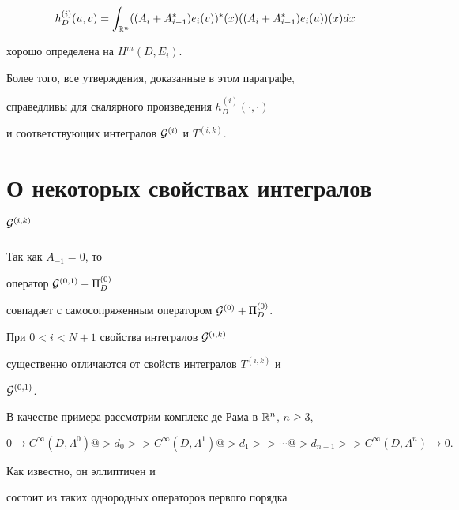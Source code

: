 \begin{examnonum}
$$


h^{(i)}_D (u,v) =


\int_{\Bbb R^n} ((A_i+A^*_{i-1}) e_i (v))^* (x)


((A_i+A^*_{i-1})e_i (u)) (x) dx


$$


хорошо определена на $H^m (D, E_i)$.


Более того, все утверждения, доказанные в этом параграфе,


справедливы для скалярного произведения $h^{(i)}_D(\cdot,\cdot)$


и соответствующих интегралов ${\cal G}^{(i)}$ и $T^{(i,k)}$.


\end{examnonum}











\section{О некоторых свойствах интегралов ${\cal G}^{(i,k)}$}


\label{S.Gik}





Так как $A_{-1}=0$, то


оператор ${\cal G}^{(0,1)}+\Pi^{(0)}_D$


совпадает с самосопряженным оператором ${\cal G}^{(0)}+\Pi ^{(0)}_D$.


При $0<i<N+1$ свойства интегралов ${\cal G}^{(i,k)}$


существенно отличаются от свойств интегралов $T^{(i,k)}$ и


${\cal G}^{(0,1)}$.





В качестве примера рассмотрим комплекс де Рама в ${\Bbb R}^n$, $n\geq3$,


$$


0 \to C^\infty (D, \Lambda ^0)@>{d_0}>>


C^\infty (D, \Lambda ^1)@>{d_1}>> \dotsb


@>{d_{n-1}}>> C^\infty (D,\Lambda ^n)\to 0.


$$


Как известно, он эллиптичен и


состоит из таких однородных операторов первого порядка



